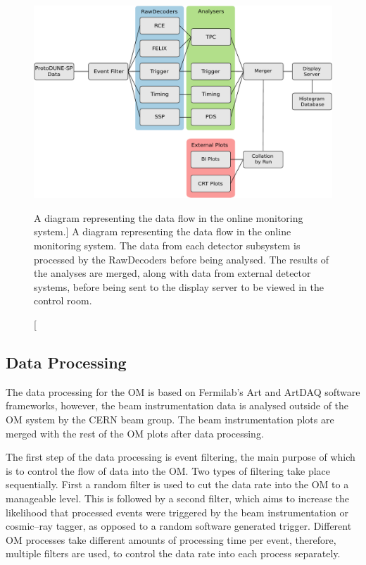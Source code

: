 \begin{figure}
	\centering
	\includegraphics[width=\textwidth]{figures/om_flow.pdf}
	\caption
	[A diagram representing the data flow in the \protodune{} online monitoring system.]
	{A diagram representing the data flow in the \protodune{} online monitoring
	system. The data from each detector subsystem is processed by the RawDecoders
	before being analysed. The results of the analyses are merged, along with data
	from external detector systems, before being sent to the display server to be
	viewed in the control room.}
	\label{fig:om_flow}
\end{figure}

\subsection{Data Processing}
The data processing for the OM is based on Fermilab's Art and ArtDAQ software
frameworks\cite{Green:2012gv, 6495515}, however, the beam instrumentation data 
is analysed outside of the OM system by the CERN beam group. The beam 
instrumentation plots are merged with the rest of the OM plots after data 
processing.

The first step of the data processing is event filtering, the main purpose of
which is to control the flow of data into the OM. Two types of filtering
take place sequentially. First a random filter is used to cut the data rate 
into the OM to a manageable level. This is followed by a second filter, which 
aims to increase the likelihood that processed events were triggered by the 
beam instrumentation or cosmic--ray tagger, as opposed to a random software 
generated trigger. Different OM processes take different amounts of processing 
time per event, therefore, multiple filters are used, to control the data rate 
into each process separately.

